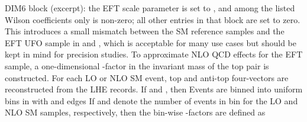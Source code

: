 \markdownRendererUlItem DIM6 block (excerpt): the EFT scale parameter is set to , and among the listed Wilson coefficients only  is non-zero; all other entries in that block are set to zero.\markdownRendererUlItemEnd 
\markdownRendererUlEndTight \markdownRendererUlItemEnd 
\markdownRendererUlEnd \markdownRendererInterblockSeparator
{}This introduces a small mismatch between the SM reference samples and the EFT UFO sample in  and , which is acceptable for many use cases but should be kept in mind for precision studies.\markdownRendererInterblockSeparator
{}
\markdownRendererSectionEnd \markdownRendererSectionBegin
{}\markdownRendererInterblockSeparator
{}To approximate NLO QCD effects for the EFT sample, a one-dimensional -factor in the invariant mass of the top pair  is constructed.\markdownRendererParagraphSeparator
{}For each LO or NLO SM event, top and anti-top four-vectors are reconstructed from the LHE records. If  and , then\markdownRendererParagraphSeparator
{}\markdownRendererParagraphSeparator
{}Events are binned into  uniform bins in  with\markdownRendererParagraphSeparator
{}\markdownRendererParagraphSeparator
{}and edges\markdownRendererParagraphSeparator
{}\markdownRendererParagraphSeparator
{}If  and  denote the number of events in bin  for the LO and NLO SM samples, respectively, then the bin-wise -factors are defined as\markdownRendererParagraphSeparator
{}\markdownRendererParagraphSeparator
